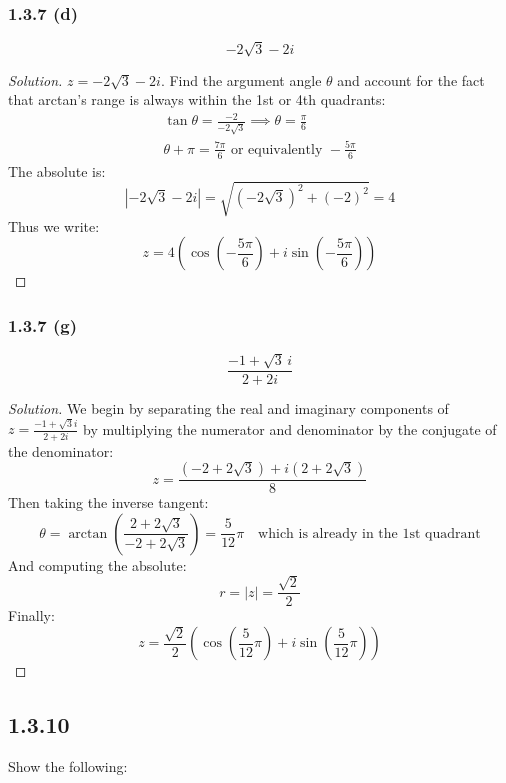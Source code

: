 \documentclass{article}
\newenvironment{solution}{
\begin{proof}[Solution]}{
\end{proof}}
\begin{document}
\subsubsection*{1.3.7 (d)}
\[
  -2\sqrt{3} - 2i
\]
\begin{solution}
  $z = -2\sqrt{3} - 2i$.
  Find the argument angle $\theta$ and account for the fact that arctan's range is always within the 1st or 4th quadrants:
  \begin{gather*}
    \tan\theta = \frac{-2}{-2\sqrt{3}} \implies \theta = \frac{\pi}{6} \\
    \theta + \pi = \frac{7\pi}{6} \text{ or equivalently } -\frac{5\pi}{6}
  \end{gather*}
  The absolute is:
  \[
    |-2\sqrt{3} - 2i| = \sqrt{(-2\sqrt{3})^2 + (-2)^2} = 4
  \]
  Thus we write:
  \[
    z = 4\left(\cos\left(-\frac{5\pi}{6}\right) + i\sin\left(-\frac{5\pi}{6}\right)\right)
  \]
\end{solution}

\subsubsection*{1.3.7 (g)}
\[
  \frac{-1+\sqrt{3}\,i}{2+2i}
\]
\begin{solution}
  We begin by separating the real and imaginary components of $z = \frac{-1+\sqrt{3}i}{2+2i}$ by multiplying the numerator and denominator by the conjugate of the denominator:
  \[
    z = \frac{(-2 + 2\sqrt{3}) + i(2 + 2\sqrt{3})}{8}
  \]
  Then taking the inverse tangent:
  \[
    \theta = \arctan\left(\frac{2+2\sqrt{3}}{-2+2\sqrt{3}}\right) = \frac{5}{12}\pi \quad \text{which is already in the 1st quadrant}
  \]
  And computing the absolute:
  \[
    r = |z| = \frac{\sqrt{2}}{2}
  \]
  Finally:
  \[
    z = \frac{\sqrt{2}}{2}\left(\cos\left(\frac{5}{12}\pi\right) + i\sin\left(\frac{5}{12}\pi\right)\right)
  \]
\end{solution}

\subsection*{1.3.10}
Show the following:
\end{document}
